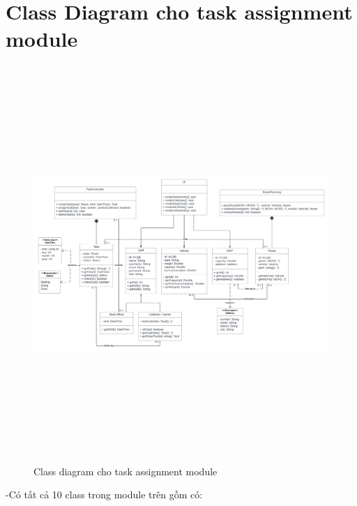 \section{Class Diagram cho task assignment module}
     \begin{figure}[h]
                \centering
                \includegraphics[width=17.0cm,height=15cm]{imgs/class diagram/UWC class diagram.png}
                \caption{Class diagram cho task assignment module}
            \end{figure}
    \newpage
    -Có tất cả 10 class trong module trên gồm có:
